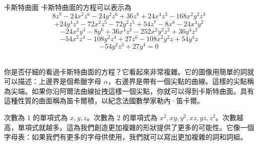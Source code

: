 \begin{surferPage}{卡斯特曲面}
卡斯特曲面的方程可以表示為
  \smallskip
\[8z^9-24x^2z^6-24y^2z^6+36z^8+24x^4z^3-168x^2y^2z^3\]
\[+24y^4z^3-72x^2z^5-72y^2z^5+54z^7-8x^6-24x^4y^2\]
\[-24x^2y^4-8y^6 + 36x^4z^2-252x^2y^2z^2+36y^4z^2\]
\[- 54x^2z^4-108y^2z^4 + 27z^6-108x^2y^2z + 54y^4z\]
\[-54y^2z^3 + 27y^4 = 0\]\\
\vspace{0.3cm}

你是否仔細的看過卡斯特曲面的方程？它看起來非常複雜。它的圖像用簡單的詞就可以描述：上邊界是個希臘字母 $\alpha$，右邊界是帶有一個尖點的曲線。這樣的尖點稱為尖端。如果你沿阿爾法曲線扯拽這樣一個尖點，你就可以得到卡斯特曲面。具有這種性質的曲面稱為笛卡爾積，以紀念法國數學家勒內·笛卡爾。\\

\vspace{0.3cm}

次數為 $1$ 的單項式為 $x, y, z$。次數為 $2$ 的單項式為 $x^2, xy, y^2, xz, yz, z^2$。次數越高，單項式就越多。這為我們創造更加複雜的形狀提供了更多的可能性。它像一個字母表：如果我們有更多的字母供使用，我們就可以寫出更加複雜的詞和詞組。
\end{surferPage}
